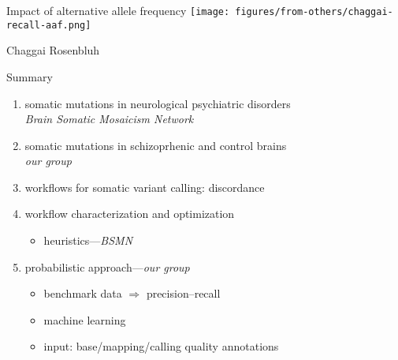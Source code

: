 \documentclass{beamer}
\begin{document}
\begin{frame}{Impact of alternative allele frequency}
\texttt{[image: figures/from-others/chaggai-recall-aaf.png]}

\tiny{Chaggai Rosenbluh}
\end{frame}


\begin{frame}{Summary}
\begin{enumerate}
\item \alert{somatic mutations} in neurological psychiatric disorders\\
\emph{Brain Somatic Mosaicism Network}
\item somatic mutations in \alert{schizoprhenic} and control brains\\
\emph{our group}
\item workflows for somatic variant calling: \alert{discordance}
\item workflow characterization and \alert{optimization}
\begin{itemize}
\item heuristics---\emph{BSMN}
\begin{itemize}
\end{itemize}
\end{itemize}
\item probabilistic approach---\emph{our group}
\begin{itemize}
\item benchmark data \(\Rightarrow\) precision--recall
\item \alert{machine learning}
\item input: base/mapping/calling \alert{quality annotations}
\end{itemize}
\end{enumerate}
\end{frame}
\end{document}
